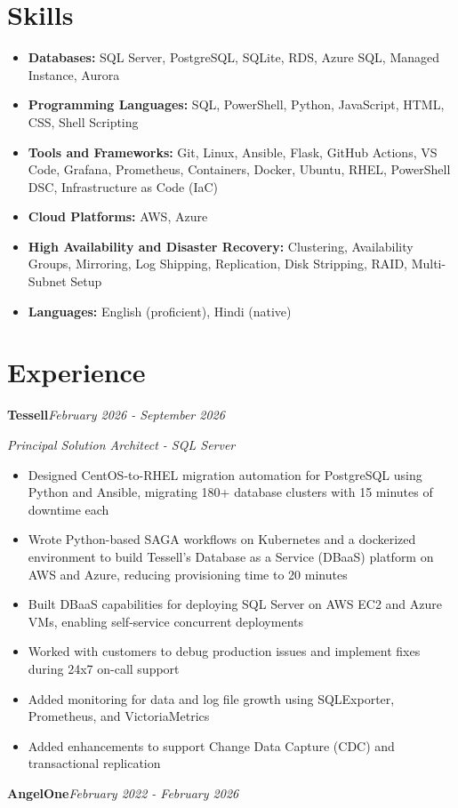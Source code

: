 \documentclass[10pt,a4paper]{article}
\begin{document}
\section{Skills}
\begin{itemize}
  \item \textbf{Databases:} SQL Server, PostgreSQL, SQLite, RDS, Azure SQL, Managed Instance, Aurora
  \item \textbf{Programming Languages:} SQL, PowerShell, Python, JavaScript, HTML, CSS, Shell Scripting
  \item \textbf{Tools and Frameworks:} Git, Linux, Ansible, Flask, GitHub Actions, VS Code, Grafana, Prometheus, Containers, Docker, Ubuntu, RHEL, PowerShell DSC, Infrastructure as Code (IaC)
  \item \textbf{Cloud Platforms:} AWS, Azure
  \item \textbf{High Availability and Disaster Recovery:} Clustering, Availability Groups, Mirroring, Log Shipping, Replication, Disk Stripping, RAID, Multi-Subnet Setup
  \item \textbf{Languages:} English (proficient), Hindi (native)
\end{itemize}

\section{Experience}

\noindent\textbf{Tessell}\hfill \textit{February 2026 - September 2026}

\textit{Principal Solution Architect - SQL Server}\\[-5pt]
\begin{itemize}
  \item Designed CentOS-to-RHEL migration automation for PostgreSQL using Python and Ansible, migrating 180+ database clusters with 15 minutes of downtime each
  \item Wrote Python-based SAGA workflows on Kubernetes and a dockerized environment to build Tessell's Database as a Service (DBaaS) platform on AWS and Azure, reducing provisioning time to 20 minutes
  \item Built DBaaS capabilities for deploying SQL Server on AWS EC2 and Azure VMs, enabling self-service concurrent deployments
  \item Worked with customers to debug production issues and implement fixes during 24x7 on-call support
  \item Added monitoring for data and log file growth using SQLExporter, Prometheus, and VictoriaMetrics
  \item Added enhancements to support Change Data Capture (CDC) and transactional replication
\end{itemize}
\vspace{14.7pt}
\noindent\textbf{AngelOne}\hfill \textit{February 2022 - February 2026}
\end{document}
